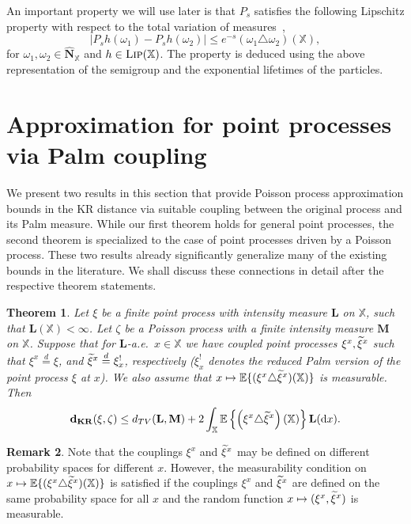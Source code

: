 \documentclass[10pt]{amsart}
\newtheorem{theo}{Theorem}[section]
\theoremstyle{definition}\newtheorem{defi}[theo]{Definition}\newtheorem{rema}[theo]{Remark}\newtheorem{exam}[theo]{Example}\newtheorem{exem}[theo]{Example}\newtheorem{nota}[theo]{Notation}
\newcommand*\bL{\mathbf{L}}
\newcommand*\bM{\mathbf{M}}
\newcommand*\bN{\mathbf{N}}
\newcommand*\dkr{\mathbf{d_{KR}}}
\newcommand*\X{\mathbb{X}}
\newcommand{\E}{\mathbb{E}}
\newcommand*\txi{\tilde{\xi}}
\newcommand*\cLip{\textsc{Lip}}
\newcommand*\md{\mathrm{d}}
\newcommand{\mean}[1] {\E\left\{{#1}\right\}}
\let\oldtilde\tilde
\renewcommand*{\tilde}[1]{\mathchoice{\widetilde{#1}}{\widetilde{#1}}{\oldtilde{#1}}{\oldtilde{#1}}}
\begin{document}
An important property we will use later is that $P_s$ satisfies the following Lipschitz property with respect to the total variation of measures~\cite[Lemma~5.2]{decreusefond_functional_2016},
\begin{equation}\label{e:pslip}
\left|P_sh(\omega_1) - P_sh(\omega_2)\right| \leq e^{-s}\left(\omega_1 \triangle \omega_2\right)(\X),
\end{equation}
for $\omega_1,\omega_2 \in \widehat{\bN}_{\X}$ and $h \in \cLip(\X)$. The property is deduced using the above representation of the semigroup and the exponential lifetimes of the particles.

\section{Approximation for point processes via Palm coupling}\label{sec:Coupling}
We present two results in this section that provide Poisson process approximation bounds in the KR distance via suitable coupling between the original process and its Palm measure. While our first theorem holds for general point processes, the second theorem is specialized to the case of point processes driven by a Poisson process. These two results already significantly generalize many of the existing bounds in the literature. We shall discuss these connections in detail after the respective theorem statements.


\begin{theo}\label{t:gen_Poisson_approx}
Let $\xi$ be a finite point process with intensity measure $\bL$ on $\X$, such that $\bL(\X) < \infty$. Let $\zeta$ be a Poisson process with a finite intensity measure $\bM$ on $\X$. Suppose that for $\bL$-a.e.\ $x \in \X$ we have coupled point processes $\xi^{x},\txi^{x}$ such that $\xi^{x}\stackrel{d}{=}\xi$, and $\txi^{x}\stackrel{d}{=}\xi^{!}_{x}$, respectively ($\xi^{!}_{x}$ denotes the reduced Palm version of the point process $\xi$ at $x$). We also assume that $x\mapsto \E\{(\xi^{x} \triangle \txi^{x})(\X)\}$ is measurable. Then
\[
\dkr(\xi,\zeta) \leq d_{TV}(\bL,\bM) + 2 \int_{\X} \mean{\left(\xi^{x} \triangle \txi^{x}\right)(\X)}\bL(\md x).
\]
\end{theo}

\begin{rema}
Note that the couplings $\xi^x$ and $\tilde{\xi}^x$ may be defined on different probability spaces for different $x$. However, the measurability condition on $x\mapsto \E\{(\xi^{x} \triangle \txi^{x})(\X)\}$ is satisfied if the couplings $\xi^{x}$ and $\txi^{x}$ are defined on the same probability space for all {$x$} and the random function $x\mapsto (\xi^{x}, \txi^{x})$ is measurable.
\end{rema}
\end{document}
